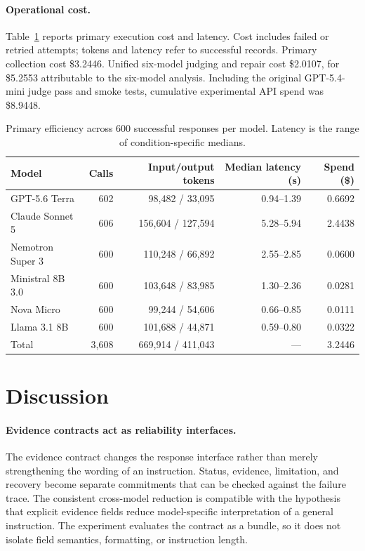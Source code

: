 \documentclass[runningheads]{llncs}
\begin{document}
\paragraph{Operational cost.}
Table~\ref{tab:efficiency} reports primary execution cost and latency. Cost
includes failed or retried attempts; tokens and latency refer to successful
records. Primary collection cost \$3.2446. Unified six-model judging and
repair cost \$2.0107, for \$5.2553 attributable to the six-model analysis.
Including the original GPT-5.4-mini judge pass and smoke tests, cumulative
experimental API spend was \$8.9448.

\begin{table}[!tbp]
\centering
\small
\caption{Primary efficiency across 600 successful responses per model.
Latency is the range of condition-specific medians.}
\label{tab:efficiency}
\begin{tabular}{lrrrr}
\toprule
Model & Calls & Input/output tokens & Median latency (s) & Spend (\$) \\
\midrule
GPT-5.6 Terra & 602 & 98,482 / 33,095 & 0.94--1.39 & 0.6692 \\
Claude Sonnet 5 & 606 & 156,604 / 127,594 & 5.28--5.94 & 2.4438 \\
Nemotron Super 3 & 600 & 110,248 / 66,892 & 2.55--2.85 & 0.0600 \\
Ministral 8B 3.0 & 600 & 103,648 / 83,985 & 1.30--2.36 & 0.0281 \\
Nova Micro & 600 & 99,244 / 54,606 & 0.66--0.85 & 0.0111 \\
Llama 3.1 8B & 600 & 101,688 / 44,871 & 0.59--0.80 & 0.0322 \\
\midrule
Total & 3,608 & 669,914 / 411,043 & --- & 3.2446 \\
\bottomrule
\end{tabular}
\end{table}

\section{Discussion}

\paragraph{Evidence contracts act as reliability interfaces.}
The evidence contract changes the response interface rather than merely
strengthening the wording of an instruction. Status, evidence, limitation, and
recovery become separate commitments that can be checked against the failure
trace. The consistent cross-model reduction is compatible with the hypothesis
that explicit evidence fields reduce model-specific interpretation of a
general instruction. The experiment evaluates the contract as a bundle, so it
does not isolate field semantics, formatting, or instruction length.
\end{document}
